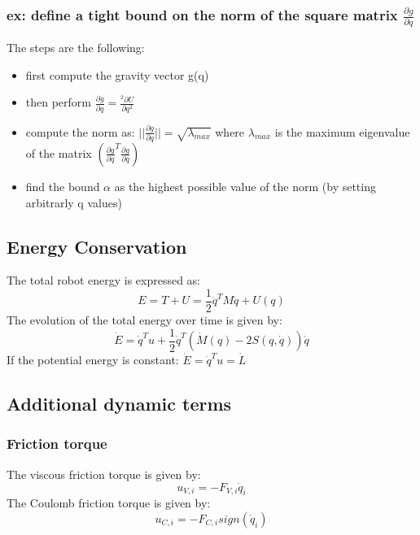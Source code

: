 \documentclass[a4paper,12pt]{article}
\begin{document}
\subsubsection{ex: define a tight bound on the norm of the square matrix $\frac{\partial{g}}{\partial{q}}$} \label{sec:define a tight bound on the norm of the square matrix}
The steps are the following:
\begin{itemize}
    \item first compute the gravity vector g(q)
    \item then perform $\frac{\partial{g}}{\partial{q}}=\frac{^2\partial{U}}{\partial{q}^2}$
    \item compute the norm as: $||\frac{\partial{g}}{\partial{q}}||= \sqrt{\lambda_{max}}$
   where $\lambda_{max}$ is the maximum eigenvalue of the matrix $(\frac{\partial{g}}{\partial{q}}^T \frac{\partial{g}}{\partial{q}})$
    \item find the bound $\alpha$ as the highest possible value of the norm (by setting arbitrarly q values)
\end{itemize}


\subsection{Energy Conservation}
The total robot energy is expressed as: 
\begin{equation}
    E = T + U = \frac{1}{2}\dot{q}^T M \dot{q} + U(q)
\end{equation}
The evolution of the total energy over time is given by:
\begin{equation}
    \dot{E}=\dot{q}^Tu+\frac{1}{2}\dot{q}^T(\dot{M}(q)-2S(q,\dot{q}))\dot{q}
\end{equation}
If the potential energy is constant: $\dot{E}=\dot{q}^T u = \dot{L}$
\subsection{Additional dynamic terms}
\subsubsection{Friction torque}
The viscous friction torque is given by:
\begin{equation}
    u_{V,i}=-F_{V,i}\dot{q}_i
\end{equation}
The Coulomb friction torque is given by:
\begin{equation}
    u_{C,i}=-F_{C,i}sign(\dot{q}_i)
\end{equation}
\end{document}
